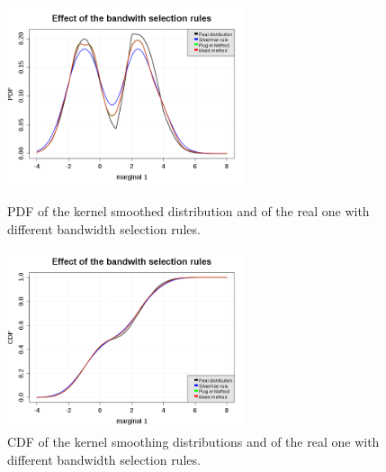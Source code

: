 \begin{figure}[H]
  \begin{minipage}{7cm}
    \begin{center}
      \includegraphics[width=7cm]{kernelSmoothingBWSel_pdf.png}
      \caption{PDF of the kernel smoothed distribution and of the real one with different bandwidth selection rules.}
      \label{pdf_KernelSmoothBWSel}
    \end{center}
  \end{minipage}
  \hfill
  \begin{minipage}{7cm}
    \begin{center}
      \includegraphics[width=7cm]{kernelSmoothingBWSel_cdf.png}
      \caption{CDF of the kernel smoothing distributions and of the real one with different bandwidth selection rules.}
      \label{cdf_KernelSmoothBWSel}
    \end{center}
  \end{minipage}
\end{figure}

